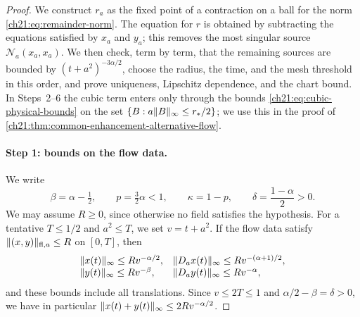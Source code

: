 \begin{proof}
We construct $r_a$ as the fixed point of a contraction on a ball for the norm \eqref{ch21:eq:remainder-norm}. The equation for $r$ is obtained by subtracting the equations satisfied by $x_a$ and $y_a$; this removes the most singular source $\mathcal N_a(x_a,x_a)$. We then check, term by term, that the remaining sources are bounded by $(t+a^2)^{-3\alpha/2}$, choose the radius, the time, and the mesh threshold in this order, and prove uniqueness, Lipschitz dependence, and the chart bound. In Steps~2--6 the cubic term enters only through the bounds \eqref{ch21:eq:cubic-physical-bounds} on the set $\{B:a\lVert B\rVert_\infty\le r_*/2\}$; we use this in the proof of \cref{ch21:thm:common-enhancement-alternative-flow}.

\paragraph{Step 1: bounds on the flow data.}
We write
\[
 \beta=\alpha-\tfrac12,\qquad p=\tfrac32\alpha<1,\qquad \kappa=1-p,\qquad \delta=\frac{1-\alpha}{2}>0 .
\]
We may assume $R\ge0$, since otherwise no field satisfies the hypothesis. For a tentative $T\le1/2$ and $a^2\le T$, we set $v=t+a^2$. If the flow data satisfy $\lVert (x,y)\rVert_{\mathrm{fl},a}\le R$ on $[0,T]$, then
\begin{equation}\label{ch21:eq:grade-bounds}
 \begin{array}{ll}
 \lVert x(t)\rVert_\infty\le Rv^{-\alpha/2},&\lVert D_ax(t)\rVert_\infty\le Rv^{-(\alpha+1)/2},\\
 \lVert y(t)\rVert_\infty\le Rv^{-\beta},&\lVert D_ay(t)\rVert_\infty\le Rv^{-\alpha},
 \end{array}
\end{equation}
and these bounds include all translations. Since $v\le2T\le1$ and $\alpha/2-\beta=\delta>0$, we have in particular $\lVert x(t)+y(t)\rVert_\infty\le2Rv^{-\alpha/2}$.


\end{proof}
